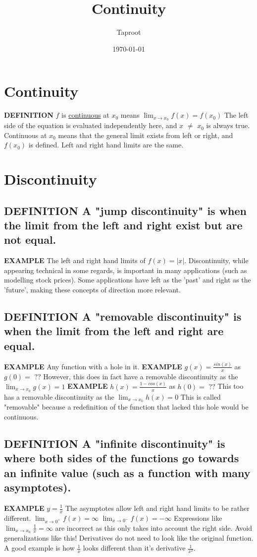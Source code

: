 \documentclass[letterpaper]{article}
\author{Taproot}
\date{\today}
\title{Continuity}
\renewcommand{\tableofcontents}{}
\begin{document}
\tableofcontents


\section{Continuity}
\label{sec:org7762f10}
\textbf{DEFINITION} \(f\) is \uline{continuous} at \(x_0\) means \(\lim_{x \rightarrow x_0} f(x) = f(x_0)\)
  The left side of the equation is evaluated independently here, and \(x\) \(\neq\) \(x_0\) is always true.
Continuous at \(x_0\) means that the general limit exists from left or right, and \(f(x_0)\) is defined. Left and right hand limits are the same.

\section{Discontinuity}
\label{sec:org609dca6}
\subsection{\textbf{DEFINITION} A "jump discontinuity" is when the limit from the left and right exist but are not equal.}
\label{sec:org22fca89}
\textbf{EXAMPLE} The left and right hand limits of \(f(x) = |x|\).
  Discontinuity, while appearing technical in some regards, is important in many applications (such as modelling stock prices). Some applications have left as the 'past' and right as the 'future', making these concepts of direction more relevant.
\subsection{\textbf{DEFINITION} A "removable discontinuity" is when the limit from the left and right are equal.}
\label{sec:orgb67bce2}
\textbf{EXAMPLE} Any function with a hole in it.
\textbf{EXAMPLE} \(g(x) = \frac{sin(x)}{x}\) as \(g(0) = \text{ ??}\)
However, this does in fact have a removable discontinuity as the \(\lim_{x \rightarrow x_0} g(x) = 1\)
\textbf{EXAMPLE} \(h(x) = \frac{1-cos(x)}{x}\) as \(h(0) =\text{ ??}\)
This too has a removable discontinuity as the \(\lim_{x \rightarrow x_0} h(x) = 0\)
  This is called "removable" because a redefinition of the function that lacked this hole would be continuous.
\subsection{\textbf{DEFINITION} A "infinite discontinuity" is where both sides of the functions go towards an infinite value (such as a function with many asymptotes).}
\label{sec:org5756719}
\textbf{EXAMPLE} \(y=\frac{1}{x}\)
The asymptotes allow left and right hand limits to be rather different.
\(\lim_{x \rightarrow 0^+} f(x) = \infty\)
\(\lim_{x \rightarrow 0^-} f(x) = - \infty\)
  Expressions like \(\lim_{x \rightarrow x_0} \frac{1}{x} = \infty\) are incorrect as this only takes into account the right side. Avoid generalizations like this!
  Derivatives do not need to look like the original function.
A good example is how \(\frac{1}{x}\) looks different than it's derivative \(\frac{1}{x^2}\).
\end{document}
